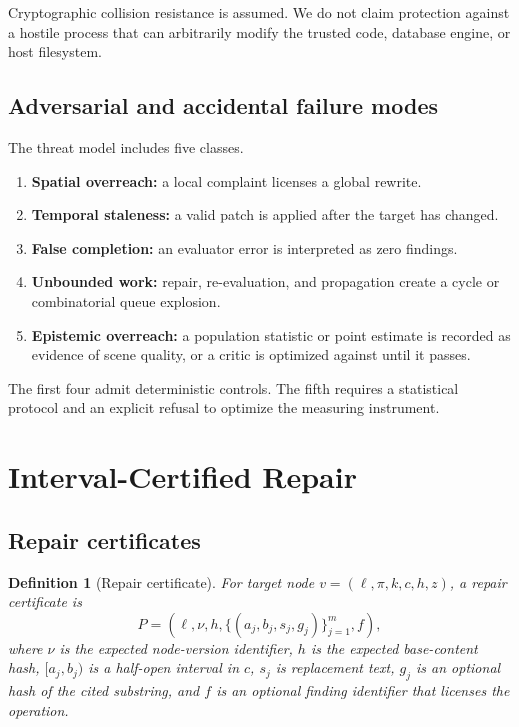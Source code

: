 \documentclass[11pt]{article}
\newtheorem{definition}{Definition}[section]
\begin{document}
Cryptographic collision resistance is assumed. We do not claim protection against a hostile
process that can arbitrarily modify the trusted code, database engine, or host filesystem.

\subsection{Adversarial and accidental failure modes}

The threat model includes five classes.

\begin{enumerate}
  \item \textbf{Spatial overreach:} a local complaint licenses a global rewrite.
  \item \textbf{Temporal staleness:} a valid patch is applied after the target has changed.
  \item \textbf{False completion:} an evaluator error is interpreted as zero findings.
  \item \textbf{Unbounded work:} repair, re-evaluation, and propagation create a cycle or
  combinatorial queue explosion.
  \item \textbf{Epistemic overreach:} a population statistic or point estimate is recorded
  as evidence of scene quality, or a critic is optimized against until it passes.
\end{enumerate}

The first four admit deterministic controls. The fifth requires a statistical protocol and
an explicit refusal to optimize the measuring instrument.

\section{Interval-Certified Repair}

\subsection{Repair certificates}

\begin{definition}[Repair certificate]
For target node $v=(\ell,\pi,k,c,h,z)$, a repair certificate is
\[
 P=(\ell,\nu,h,\{(a_j,b_j,s_j,g_j)\}_{j=1}^m,f),
\]
where $\nu$ is the expected node-version identifier, $h$ is the expected base-content hash,
$[a_j,b_j)$ is a half-open interval in $c$, $s_j$ is replacement text, $g_j$ is an optional
hash of the cited substring, and $f$ is an optional finding identifier that licenses the
operation.
\end{definition}
\end{document}
